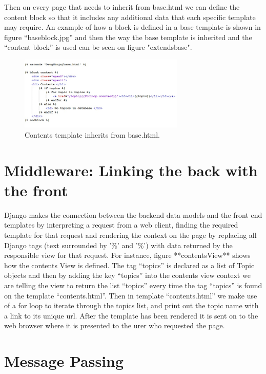 \documentclass{l3proj}
\begin{document}
{\begin{figure}[h!]
\end{figure}
Then on every page that needs to inherit from base.html we can define the content block so that it includes any additional data that each specific template may require. An example of how a block is defined in a base template is shown in figure “baseblock.jpg” and then the way the base template is inherited and the “content block” is used can be seen on figure "extendsbase".
\begin{figure}[h!]
   \caption{Contents template inherits from base.html.}
   \centering
     \includegraphics[width=0.7\textwidth]{images/extendsbase.jpg}
\end{figure}

\section{Middleware: Linking the back with the front}
Django makes the connection between the backend data models and the front end templates by interpreting a request from a web client, finding the required template for that request and rendering the context on the page by replacing all Django tags (text surrounded by '{\%' and  '\%}') with data returned by the responsible view for that request.  For  instance, figure **contentsView** shows how the contents View is defined. The tag “topics” is declared as a list of Topic objects and then by adding the key “topics” into the contents view context we are telling the view to return the list “topics” every time the tag “topics” is found on the template “contents.html”. Then in template “contents.html” we make use of a for loop to iterate through the topics list, and print out the topic name with a link to its unique url. After the template has been rendered it is sent on to the web browser where it is presented to the urer who requested the page.
\section{Message Passing}

}
\end{document}
